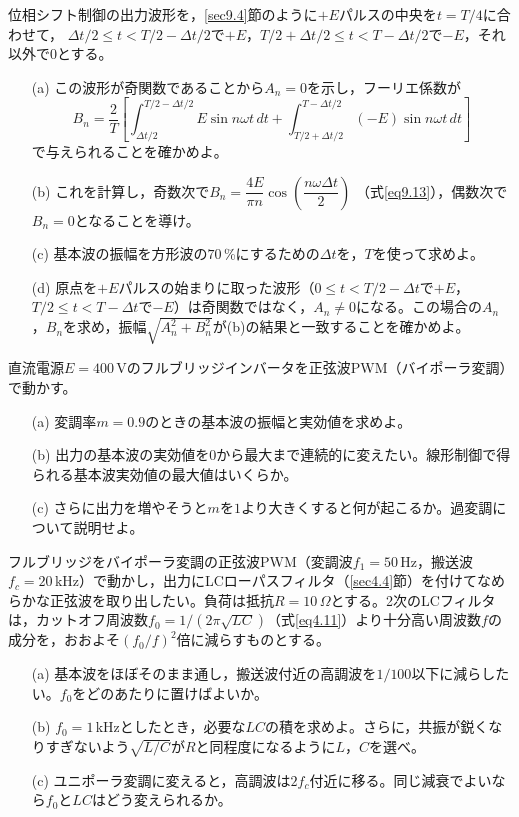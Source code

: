 \begin{章末問題}
\item \label{ex9.4}位相シフト制御の出力波形を，\ref{sec9.4}節のように$+E$パルスの中央を$t = T/4$に合わせて，
$\mathit{\Delta}t/2 \le t < T/2 - \mathit{\Delta}t/2$で$+E$，$T/2 + \mathit{\Delta}t/2 \le t < T - \mathit{\Delta}t/2$で$-E$，それ以外で$0$とする。
\begin{enumerate}
\item[(a)] この波形が奇関数であることから$A_n = 0$を示し，フーリエ係数が
\begin{equation*}
B_n = \frac{2}{T}\left[\int_{\mathit{\Delta}t/2}^{T/2-\mathit{\Delta}t/2}E\sin n\omega t\,dt
+ \int_{T/2+\mathit{\Delta}t/2}^{T-\mathit{\Delta}t/2}(-E)\sin n\omega t\,dt\right]
\end{equation*}
で与えられることを確かめよ。
\item[(b)] これを計算し，奇数次で$B_n = \dfrac{4E}{\pi n}\cos\!\left(\dfrac{n\omega\mathit{\Delta}t}{2}\right)$
（式\ref{eq9.13}），偶数次で$B_n = 0$となることを導け。
\item[(c)] 基本波の振幅を方形波の$70$\,\%にするための$\mathit{\Delta}t$を，$T$を使って求めよ。
\item[(d)] 原点を$+E$パルスの始まりに取った波形（$0 \le t < T/2-\mathit{\Delta}t$で$+E$，$T/2 \le t < T-\mathit{\Delta}t$で$-E$）は奇関数ではなく，$A_n \ne 0$になる。この場合の$A_n$，$B_n$を求め，振幅$\sqrt{A_n^2+B_n^2}$が(b)の結果と一致することを確かめよ。
\end{enumerate}

\item \label{ex9.5}直流電源$E = 400$\,Vのフルブリッジインバータを正弦波PWM（バイポーラ変調）で動かす。
\begin{enumerate}
\item[(a)] 変調率$m = 0.9$のときの基本波の振幅と実効値を求めよ。
\item[(b)] 出力の基本波の実効値を$0$から最大まで連続的に変えたい。線形制御で得られる基本波実効値の最大値はいくらか。
\item[(c)] さらに出力を増やそうと$m$を$1$より大きくすると何が起こるか。過変調について説明せよ。
\end{enumerate}

\item \label{ex9.6}フルブリッジをバイポーラ変調の正弦波PWM（変調波$f_1 = 50$\,Hz，搬送波$f_c = 20$\,kHz）で動かし，出力にLCローパスフィルタ（\ref{sec4.4}節）を付けてなめらかな正弦波を取り出したい。負荷は抵抗$R = 10\,\Omega$とする。2次のLCフィルタは，カットオフ周波数$f_0 = 1/(2\pi\sqrt{LC})$（式\ref{eq4.11}）より十分高い周波数$f$の成分を，おおよそ$(f_0/f)^2$倍に減らすものとする。
\begin{enumerate}
\item[(a)] 基本波をほぼそのまま通し，搬送波付近の高調波を$1/100$以下に減らしたい。$f_0$をどのあたりに置けばよいか。
\item[(b)] $f_0 = 1$\,kHzとしたとき，必要な$LC$の積を求めよ。さらに，共振が鋭くなりすぎないよう$\sqrt{L/C}$が$R$と同程度になるように$L$，$C$を選べ。
\item[(c)] ユニポーラ変調に変えると，高調波は$2f_c$付近に移る。同じ減衰でよいなら$f_0$と$LC$はどう変えられるか。
\end{enumerate}


\end{章末問題}
